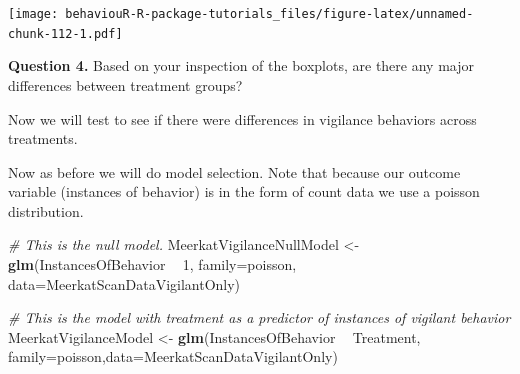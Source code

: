 \documentclass[]{book}
\newenvironment{Shaded}{\begin{snugshade}}{\end{snugshade}}
\newcommand{\CommentTok}[1]{\textcolor[rgb]{0.56,0.35,0.01}{\textit{#1}}}
\newcommand{\DataTypeTok}[1]{\textcolor[rgb]{0.13,0.29,0.53}{#1}}
\newcommand{\DecValTok}[1]{\textcolor[rgb]{0.00,0.00,0.81}{#1}}
\newcommand{\KeywordTok}[1]{\textcolor[rgb]{0.13,0.29,0.53}{\textbf{#1}}}
\newcommand{\NormalTok}[1]{#1}
\newcommand{\OperatorTok}[1]{\textcolor[rgb]{0.81,0.36,0.00}{\textbf{#1}}}
\newcommand{\StringTok}[1]{\textcolor[rgb]{0.31,0.60,0.02}{#1}}
\begin{document}
\texttt{[image: behaviouR-R-package-tutorials\_files/figure-latex/unnamed-chunk-112-1.pdf]}

\textbf{Question 4.} Based on your inspection of the boxplots, are there any major differences between treatment groups?

Now we will test to see if there were differences in vigilance behaviors across treatments.

\begin{Shaded}
\end{Shaded}

Now as before we will do model selection. Note that because our outcome variable (instances of behavior) is in the form of count data we use a poisson distribution.

\begin{Shaded}
\begin{Highlighting}[]
\CommentTok{# This is the null model.}
\NormalTok{MeerkatVigilanceNullModel <-}\StringTok{ }\KeywordTok{glm}\NormalTok{(InstancesOfBehavior }\OperatorTok{~}\StringTok{ }\DecValTok{1}\NormalTok{, }\DataTypeTok{family=}\NormalTok{poisson, }\DataTypeTok{data=}\NormalTok{MeerkatScanDataVigilantOnly)}

\CommentTok{# This is the model with treatment as a predictor of instances of vigilant behavior}
\NormalTok{MeerkatVigilanceModel <-}\StringTok{ }\KeywordTok{glm}\NormalTok{(InstancesOfBehavior }\OperatorTok{~}\StringTok{ }\NormalTok{Treatment, }\DataTypeTok{family=}\NormalTok{poisson,}\DataTypeTok{data=}\NormalTok{MeerkatScanDataVigilantOnly)}
\end{Highlighting}
\end{Shaded}
\end{document}
